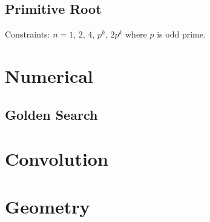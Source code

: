 \documentclass{article}
\begin{document}
\begin{multicols}{2}
    \subsection{Primitive Root}
    Constraints: $n=1$, $2$, $4$, $p^k$, $2p^{k}$ where $p$ is odd prime.
    
    
    \section{Numerical}
    \subsection{Golden Search}
    

    \section{Convolution}

    \section{Geometry}
\end{multicols}
\end{document}
